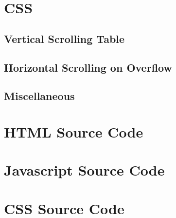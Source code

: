 \documentclass[letterpaper]{article}
\begin{document}
\section{CSS}\label{CSS}

\subsection{Vertical Scrolling Table}

\subsection{Horizontal Scrolling on Overflow}\label{overflow-x}

\subsection{Miscellaneous}

\newpage

\appendix
\section{HTML Source Code}


\newpage

\section{Javascript Source Code}


\newpage

\section{CSS Source Code}

\end{document}
